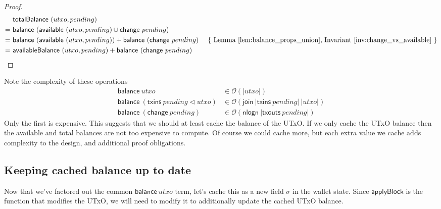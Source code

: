 \documentclass{article}
\newcommand{\order}[1]{\mathcal{O}\left(#1\right)}
\newcommand{\restrictdom}{\lhd}
\numberwithin{equation}{lemma}
\begin{document}
\begin{proof}
\begin{align*}
   & ~ \mathsf{totalBalance} ~ (utxo, pending) \\
 = & ~ \mathsf{balance} ~ (\mathsf{available} ~ (utxo, pending) \cup \mathsf{change} ~ pending) \\
 = & ~ \mathsf{balance} ~ (\mathsf{available} ~ (utxo, pending))
     + \mathsf{balance} ~ (\mathsf{change} ~ pending)
   & \text{ \{ Lemma~\ref{lem:balance_props_union}, Invariant~\ref{inv:change_vs_available} \}} \\
=  & ~ \mathsf{availableBalance} ~ (utxo, pending) + \mathsf{balance} ~ (\mathsf{change} ~ pending)
\end{align*}
\end{proof}

Note the complexity of these operations
%
\begin{equation*}
\begin{split}
\mathsf{balance} ~ utxo & \in \order{|utxo|} \\
\mathsf{balance} ~ (\mathsf{txins} ~ pending \restrictdom utxo) & \in \order{\mathsf{join} ~ |\mathsf{txins}~ pending| ~ |utxo|} \\
\mathsf{balance} ~ (\mathsf{change} ~ pending) & \in \order{\mathsf{nlogn} ~ |\mathsf{txouts}~ pending|}
\end{split}
\end{equation*}
%
Only the first is expensive. This suggests that we should at least cache the
balance of the UTxO. If we only cache the UTxO balance then the available and total
balances are not too expensive to compute. Of course we could cache more, but
each extra value we cache adds complexity to the design, and additional proof
obligations.

\subsection{Keeping cached balance up to date}
\label{sec:applyBlock_incr}

Now that we've factored out the common $\mathsf{balance} ~ \mathit{utxo}$
term, let's cache this as a new field $\sigma$ in the wallet state. Since
$\mathsf{applyBlock}$ is the function that modifies the UTxO, we will
need to modify it to additionally update the cached UTxO balance.
\end{document}
